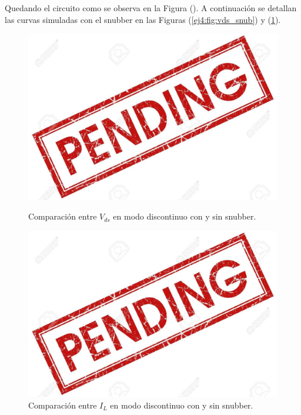 Quedando el circuito como se observa en la Figura (). A continuación se detallan las curvas simuladas con el snubber en las Figuras (\ref{ej4:fig:vds_snub}) y (\ref{ej4:fig:il_snub}).

\begin{figure}[H]
	\centering
	\begin{minipage}{0.495\textwidth}
		\centering
		\includegraphics[width=\textwidth]{ImagenesEjercicio-4/pend}%
		\caption{Comparación entre $V_{ds}$ en modo discontinuo con y sin snubber.}
		\label{ej4:fig:vds_snub}
	\end{minipage}\hfill
	\begin{minipage}{0.495\textwidth}
		\centering
		\includegraphics[width=\textwidth]{ImagenesEjercicio-4/pend}%
		\caption{Comparación entre $I_{L}$ en modo discontinuo con y sin snubber.}
		\label{ej4:fig:il_snub}
	\end{minipage}
\end{figure}

